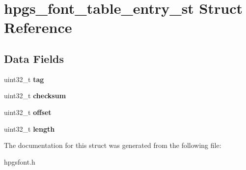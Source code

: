 \section{hpgs\_\-font\_\-table\_\-entry\_\-st Struct Reference}
\label{structhpgs__font__table__entry__st}
\subsection*{Data Fields}
\begin{DoxyCompactItemize}
\item 
uint32\_\-t {\bfseries tag}\label{structhpgs__font__table__entry__st_a15451bc0f0f64309dce051c7517ff163}

\item 
uint32\_\-t {\bfseries checksum}\label{structhpgs__font__table__entry__st_a2f03e7a81d5f2fbb94a7fdc80810f11e}

\item 
uint32\_\-t {\bfseries offset}\label{structhpgs__font__table__entry__st_a0a669db2b95638b2aeaf632d698618ef}

\item 
uint32\_\-t {\bfseries length}\label{structhpgs__font__table__entry__st_acf55125d02d2e92a36eb61541de7a9d3}

\end{DoxyCompactItemize}


The documentation for this struct was generated from the following file:\begin{DoxyCompactItemize}
\item 
hpgsfont.h\end{DoxyCompactItemize}
